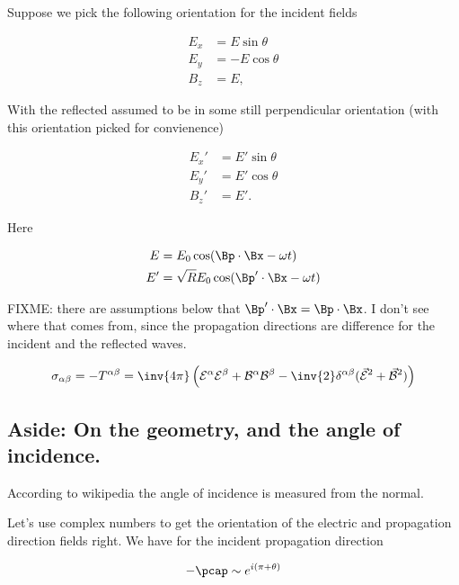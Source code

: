 Suppose we pick the following orientation for the incident fields

\begin{align}\label{eqn:relativisticElectrodynamicsT9:70}
E_x &= E \sin\theta \\
E_y &= -E \cos\theta \\
B_z &= E ,
\end{align}

With the reflected assumed to be in some still perpendicular orientation (with this orientation picked for convienence)

\begin{align}\label{eqn:relativisticElectrodynamicsT9:90}
E_x' &= E' \sin\theta \\
E_y' &= E' \cos\theta \\
B_z' &= E'.
\end{align}

Here

\begin{align}\label{eqn:relativisticElectrodynamicsT9:110}
E &= E_0 \cos(\Bp \cdot \Bx - \omega t) \\
E' &= \sqrt{R} E_0 \cos(\Bp' \cdot \Bx - \omega t)
\end{align}

FIXME: there are assumptions below that $\Bp' \cdot \Bx = \Bp \cdot \Bx$.  I don't see where that comes from, since the propagation directions are difference for the incident and the reflected waves.

\begin{equation}\label{eqn:relativisticElectrodynamicsT9:130}
\sigma_{\alpha\beta} = -T^{\alpha\beta} = \inv{4\pi} \left(
\mathcal{E}^\alpha
\mathcal{E}^\beta
+\mathcal{B}^\alpha
\mathcal{B}^\beta
- \inv{2} \delta^{\alpha\beta} ( \vec{\mathcal{E}}^2 + \vec{\mathcal{B}}^2 )
\right)
\end{equation}

\subsection{Aside: On the geometry, and the angle of incidence.}

According to wikipedia \cite{wiki:angleOfIncidence} the angle of incidence is measured from the normal.

Let's use complex numbers to get the orientation of the electric and propagation direction fields right.  We have for the incident propagation direction

\begin{equation}\label{eqn:relativisticElectrodynamicsT9:n}
-\pcap \sim e^{i (\pi + \theta) }
\end{equation}

